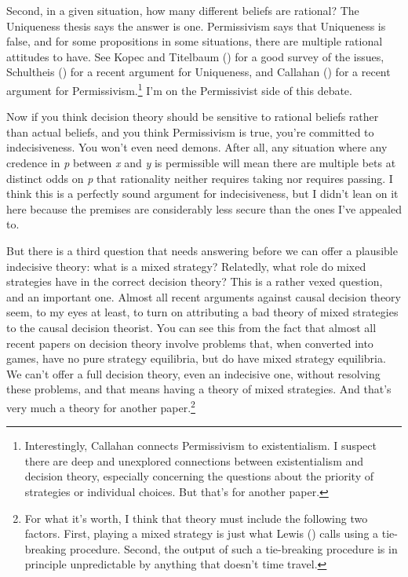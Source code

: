 \documentclass[
  11pt,
  letterpaper,
  DIV=11,
  numbers=noendperiod,
  twoside]{scrartcl}
\begin{document}
Second, in a given situation, how many different beliefs are rational?
The Uniqueness thesis says the answer is one. Permissivism says that
Uniqueness is false, and for some propositions in some situations, there
are multiple rational attitudes to have. See Kopec and Titelbaum
() for a good survey of the
issues, Schultheis () for a recent
argument for Uniqueness, and Callahan
() for a recent argument for
Permissivism.\footnote{Interestingly, Callahan connects Permissivism to
  existentialism. I suspect there are deep and unexplored connections
  between existentialism and decision theory, especially concerning the
  questions about the priority of strategies or individual choices. But
  that's for another paper.} I'm on the Permissivist side of this
debate.

Now if you think decision theory should be sensitive to rational beliefs
rather than actual beliefs, and you think Permissivism is true, you're
committed to indecisiveness. You won't even need demons. After all, any
situation where any credence in \emph{p} between \emph{x} and \emph{y}
is permissible will mean there are multiple bets at distinct odds on
\emph{p} that rationality neither requires taking nor requires passing.
I think this is a perfectly sound argument for indecisiveness, but I
didn't lean on it here because the premises are considerably less secure
than the ones I've appealed to.

But there is a third question that needs answering before we can offer a
plausible indecisive theory: what is a mixed strategy? Relatedly, what
role do mixed strategies have in the correct decision theory? This is a
rather vexed question, and an important one. Almost all recent arguments
against causal decision theory seem, to my eyes at least, to turn on
attributing a bad theory of mixed strategies to the causal decision
theorist. You can see this from the fact that almost all recent papers
on decision theory involve problems that, when converted into games,
have no pure strategy equilibria, but do have mixed strategy equilibria.
We can't offer a full decision theory, even an indecisive one, without
resolving these problems, and that means having a theory of mixed
strategies. And that's very much a theory for another paper.\footnote{For
  what it's worth, I think that theory must include the following two
  factors. First, playing a mixed strategy is just what Lewis
  () calls using a
  tie-breaking procedure. Second, the output of such a tie-breaking
  procedure is in principle unpredictable by anything that doesn't time
  travel.}
\end{document}
